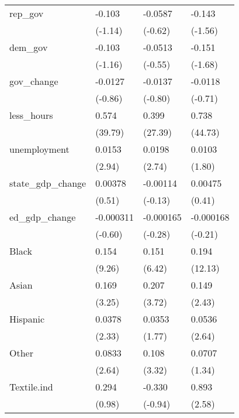 \begin{longtable}{p{3 cm} p{2 cm} p{2 cm} p{2 cm}}
rep\_gov   &   -0.103         &  -0.0587         &   -0.143         \\
          &  (-1.14)         &  (-0.62)         &  (-1.56)         \\

dem\_gov   &   -0.103         &  -0.0513         &   -0.151         \\
          &  (-1.16)         &  (-0.55)         &  (-1.68)         \\

gov\_change&  -0.0127         &  -0.0137         &  -0.0118         \\
          &  (-0.86)         &  (-0.80)         &  (-0.71)         \\

less\_hours&    0.574\sym{***}&    0.399\sym{***}&    0.738\sym{***}\\
          &  (39.79)         &  (27.39)         &  (44.73)         \\

unemployment&   0.0153\sym{**} &   0.0198\sym{**} &   0.0103         \\
          &   (2.94)         &   (2.74)         &   (1.80)         \\

state\_gdp\_change&  0.00378         & -0.00114         &  0.00475         \\
          &   (0.51)         &  (-0.13)         &   (0.41)         \\
ed\_gdp\_change  &-0.000311         &-0.000165         &-0.000168         \\
          &  (-0.60)         &  (-0.28)         &  (-0.21)         \\

Black    &    0.154\sym{***}&    0.151\sym{***}&    0.194\sym{***}\\
          &   (9.26)         &   (6.42)         &  (12.13)         \\

Asian    &    0.169\sym{**} &    0.207\sym{***}&    0.149\sym{*}  \\
          &   (3.25)         &   (3.72)         &   (2.43)         \\

Hispanic      &   0.0378\sym{*}  &   0.0353         &   0.0536\sym{**} \\
          &   (2.33)         &   (1.77)         &   (2.64)         \\

Other    &   0.0833\sym{**} &    0.108\sym{***}&   0.0707         \\
          &   (2.64)         &   (3.32)         &   (1.34)         \\
Textile.ind  &    0.294         &   -0.330         &    0.893\sym{**} \\
          &   (0.98)         &  (-0.94)         &   (2.58)         \\


\end{longtable}
